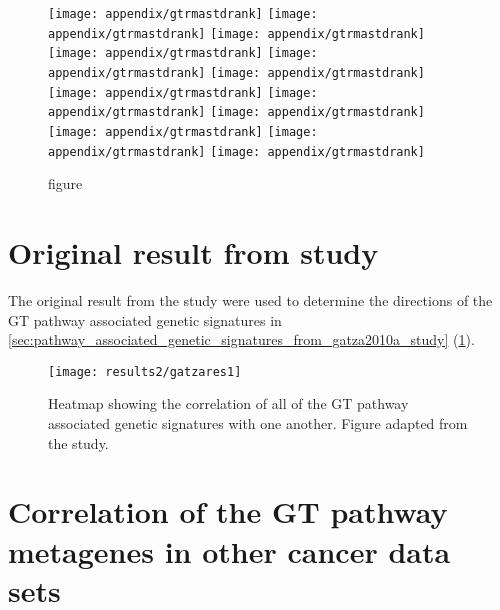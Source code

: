 \begin{appendices}
	\begin{figure}[htpb]
		\ContinuedFloat
		\captionsetup{list=off,format=cont}
		\centering
		\texttt{[image: appendix/gtrmastdrank]}
		\texttt{[image: appendix/gtrmastdrank]}
		\texttt{[image: appendix/gtrmastdrank]}\\
		\texttt{[image: appendix/gtrmastdrank]}
		\texttt{[image: appendix/gtrmastdrank]}
		\texttt{[image: appendix/gtrmastdrank]}\\
		\texttt{[image: appendix/gtrmastdrank]}
		\texttt{[image: appendix/gtrmastdrank]}
		\texttt{[image: appendix/gtrmastdrank]}\\
		\texttt{[image: appendix/gtrmastdrank]}
		\texttt{[image: appendix/gtrmastdrank]}
		\texttt{[image: appendix/gtrmastdrank]}\\
		\caption[]{figure}
	\end{figure}

	\newpage

	\section{Original result from \citet{Gatza2010a} study}
	\label{sec:result_from_gatza2010a_study}

	The original result from the \citet{Gatza2010a} study were used to determine the directions of the GT pathway associated genetic signatures in \cref{sec:pathway_associated_genetic_signatures_from_gatza2010a_study} (\cref{fig:gatza_paper_res}).

	\begin{figure}[htpb]
		\centering
		\texttt{[image: results2/gatzares1]}
		\caption[Original result presented in the \citet{Gatza2010a} study]{Heatmap showing the correlation of all of the GT pathway associated genetic signatures with one another.
		Figure adapted from the \citet{Gatza2010a} study.}
		\label{fig:gatza_paper_res}
	\end{figure}

	\section{Correlation of the GT pathway metagenes in other cancer data sets}
	\label{sec:correlation_of_the_gt_pathway_metagenes_in_other_cancer_data_sets}


\end{appendices}
